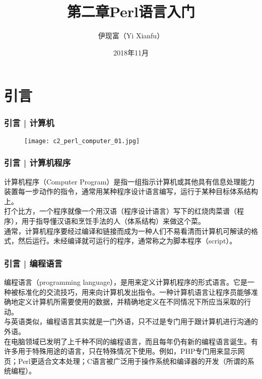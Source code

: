 



\title[Perl语言入门]{第二章\quad Perl语言入门}
\author[Yixf]{伊现富（Yi Xianfu）}
\date{2018年11月}



\section{引言}
\begin{frame}
  \frametitle{引言 | 计算机}
  \begin{figure}
    \centering
    \texttt{[image: c2\_perl\_computer\_01.jpg]}
  \end{figure}
\end{frame}

\begin{frame}
  \frametitle{引言 | 计算机程序}
  计算机程序（Computer Program）是指一组指示计算机或其他具有信息处理能力装置每一步动作的指令，通常用某种程序设计语言编写，运行于某种目标体系结构上。\\
  \vspace{1em}
  打个比方，一个程序就像一个用汉语（程序设计语言）写下的红烧肉菜谱（程序），用于指导懂汉语和烹饪手法的人（体系结构）来做这个菜。\\
  \vspace{1em}
  通常，计算机程序要经过编译和链接而成为一种人们不易看清而计算机可解读的格式，然后运行。未经编译就可运行的程序，通常称之为脚本程序（script）。
\end{frame}

\begin{frame}
  \frametitle{引言 | 编程语言}
编程语言（programming language），是用来定义计算机程序的形式语言。它是一种被标准化的交流技巧，用来向计算机发出指令。一种计算机语言让程序员能够准确地定义计算机所需要使用的数据，并精确地定义在不同情况下所应当采取的行动。\\
  \vspace{1em}
与英语类似，编程语言其实就是一门外语，只不过是专门用于跟计算机进行沟通的外语。\\
  \vspace{1em}
在电脑领域已发明了上千种不同的编程语言，而且每年仍有新的编程语言诞生。有许多用于特殊用途的语言，只在特殊情况下使用。例如，PHP专门用来显示网页；Perl更适合文本处理；C语言被广泛用于操作系统和编译器的开发（所谓的系统编程）。
\end{frame}

